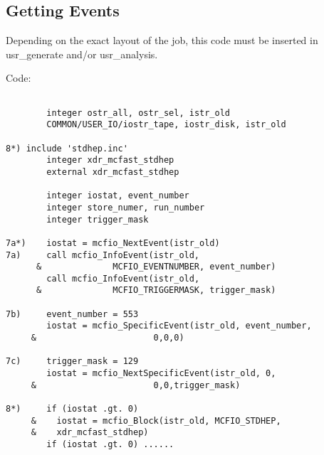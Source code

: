 \subsection{Getting Events }
\vspace{.1in}

	Depending on the exact layout of the job, this code must be
inserted in usr\_generate and/or usr\_analysis.
 
\vspace{.1in} 
 Code:
\begin{verbatim}

        integer ostr_all, ostr_sel, istr_old
        COMMON/USER_IO/iostr_tape, iostr_disk, istr_old 

8*)	include 'stdhep.inc'
        integer xdr_mcfast_stdhep
        external xdr_mcfast_stdhep
	
        integer iostat, event_number
        integer store_numer, run_number
        integer trigger_mask

7a*)    iostat = mcfio_NextEvent(istr_old)
7a)     call mcfio_InfoEvent(istr_old, 
      &              MCFIO_EVENTNUMBER, event_number)
        call mcfio_InfoEvent(istr_old, 
      &              MCFIO_TRIGGERMASK, trigger_mask) 

7b)     event_number = 553
        iostat = mcfio_SpecificEvent(istr_old, event_number, 
     &                       0,0,0)

7c)     trigger_mask = 129
        iostat = mcfio_NextSpecificEvent(istr_old, 0, 
     &                       0,0,trigger_mask)

8*)     if (iostat .gt. 0)
     &    iostat = mcfio_Block(istr_old, MCFIO_STDHEP,
     &    xdr_mcfast_stdhep)
        if (iostat .gt. 0) ......
	
\end{verbatim}
